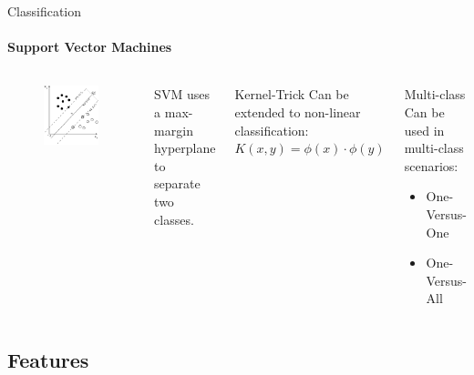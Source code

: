 \documentclass[compress]{beamer}
\begin{document}
\begin{frame}{Classification}
\framesubtitle{Support Vector Machines}
    \begin{columns}[t]
    \begin{figure}
        \includegraphics[width=.75\textwidth]{figures/Svm_max_sep_hyperplane_with_margin.png}
    \end{figure}
        SVM uses a max-margin hyperplane to separate two classes.
    \begin{block}{Kernel-Trick}
        Can be extended to non-linear classification:\\
        $K(x, y) = \phi(x)\cdot\phi(y)$
    \end{block}
    \begin{block}{Multi-class}
        Can be used in multi-class scenarios:
        \begin{itemize}
            \item One-Versus-One
            \item One-Versus-All
        \end{itemize}
    \end{block}
    \end{columns}
\end{frame}

\subsection{Features}
\end{document}
